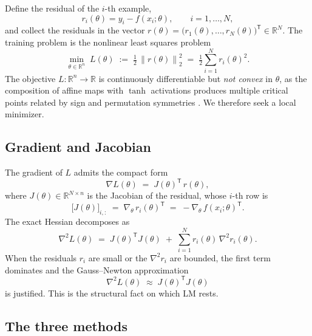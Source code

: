 \documentclass[11pt,letterpaper]{article}
\newcommand{\R}{\mathbb{R}}
\newcommand{\norm}[1]{\left\|#1\right\|}
\newcommand{\T}{^{\mathsf{T}}}
\newcommand{\grad}{\nabla}
\theoremstyle{definition}
\begin{document}
Define the residual of the $i$-th example,
\begin{equation}
r_i(\theta) = y_i - f(x_i;\theta), \qquad i = 1,\ldots, N,
\label{eq:residual-def}
\end{equation}
and collect the residuals in the vector
$r(\theta) = \bigl(r_1(\theta),\ldots, r_N(\theta)\bigr)\T \in \R^{N}$.
The training problem is the nonlinear least squares problem
\begin{equation}
\boxed{\;
\min_{\theta \in \R^{n}}\;
L(\theta)
\;:=\;
\tfrac{1}{2}\,\norm{r(\theta)}_2^{2}
\;=\;
\tfrac{1}{2}\sum_{i=1}^{N} r_i(\theta)^{2}.
\;}
\label{eq:nls}
\end{equation}
The objective $L : \R^n \to \R$ is continuously differentiable but
\emph{not convex} in $\theta$, as the composition of affine maps with
$\tanh$ activations produces multiple critical points related by sign
and permutation symmetries \citep[see, e.g.,][]{Goodfellow2016}. We
therefore seek a local minimizer.
 
\subsection{Gradient and Jacobian}
 
The gradient of $L$ admits the compact form
\begin{equation}
\grad L(\theta) \;=\; J(\theta)\T\, r(\theta),
\label{eq:gradient}
\end{equation}
where $J(\theta) \in \R^{N \times n}$ is the Jacobian of the residual,
whose $i$-th row is
\begin{equation}
\bigl[J(\theta)\bigr]_{i,:}
\;=\;
\grad_\theta\, r_i(\theta)\T
\;=\;
-\grad_\theta\, f(x_i; \theta)\T.
\label{eq:jacobian-row}
\end{equation}
The exact Hessian decomposes as
\begin{equation}
\grad^{2} L(\theta)
\;=\;
J(\theta)\T J(\theta)
\;+\;
\sum_{i=1}^{N} r_i(\theta)\, \grad^{2} r_i(\theta).
\label{eq:hessian-decomp}
\end{equation}
When the residuals $r_i$ are small or the $\grad^2 r_i$ are bounded, the
first term dominates and the Gauss--Newton approximation
\begin{equation}
\grad^{2} L(\theta) \;\approx\; J(\theta)\T J(\theta)
\label{eq:gauss-newton}
\end{equation}
is justified. This is the structural fact on which LM rests.
 
\subsection{The three methods}
\label{sec:methods}
 
\end{document}
